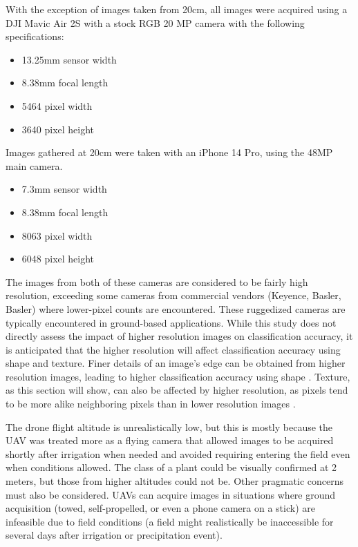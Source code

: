 \documentclass[letterpaper]{report}
\begin{document}
With the exception of images taken from 20cm, all images were acquired using a DJI Mavic Air 2S with a stock RGB 20 MP camera with the following specifications:

\begin{itemize}
	\item{13.25mm sensor width}
	\item{8.38mm focal length}
	\item{5464 pixel width}
	\item{3640 pixel height}
\end{itemize}

Images gathered at 20cm were taken with an iPhone 14 Pro, using the 48MP main camera.

\begin{itemize}
	\item{7.3mm sensor width}
	\item{8.38mm focal length}
	\item{8063 pixel width}
	\item{6048 pixel height}
\end{itemize}

The images from both of these cameras are considered to be fairly high resolution, exceeding some cameras from commercial vendors (Keyence, Basler, Basler) where lower-pixel counts are encountered. These ruggedized cameras are typically encountered in ground-based applications. While this study does not directly assess the impact of higher resolution images on classification accuracy, it is anticipated that the higher resolution will affect classification accuracy using shape and texture. Finer details of an image's edge can be obtained from higher resolution images, leading to higher classification accuracy using shape \parencite{Kroner2013-rm}. Texture, as this section will show, can also be affected by higher resolution, as pixels tend to be more alike neighboring pixels than in lower resolution images \parencite{Kupidura2022-xe}. 

The drone flight altitude is unrealistically low, but this is mostly because the UAV was treated more as a flying camera that allowed images to be acquired shortly after irrigation when needed and avoided requiring entering the field even when conditions allowed. The class of a plant could be visually confirmed at 2 meters, but those from higher altitudes could not be. Other pragmatic concerns must also be considered. UAVs can acquire images in situations where ground acquisition (towed, self-propelled, or even a phone camera on a stick) are infeasible due to field conditions (a field might realistically be inaccessible for several days after irrigation or precipitation event).
\end{document}
